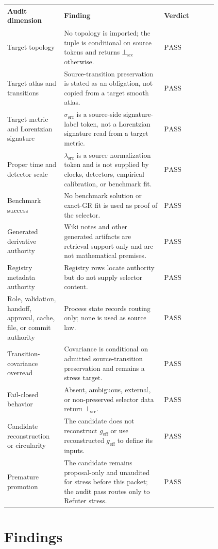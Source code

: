 \documentclass[11pt]{article}
\newcommand{\geff}{g_{\mathrm{eff}}}
\newcommand{\SigTok}{\sigma_{\mathrm{src}}}
\newcommand{\ScaleTok}{\lambda_{\mathrm{src}}}
\newcommand{\BottomSrc}{\bot_{\mathrm{src}}}
\newcommand{\Pass}{\mathrm{PASS}}
\begin{document}
\begin{longtable}{p{0.23\linewidth}p{0.41\linewidth}p{0.22\linewidth}}
\toprule
Audit dimension & Finding & Verdict \\
\midrule
Target topology & No topology is imported; the tuple is conditional on source
tokens and returns \(\BottomSrc\) otherwise. & \(\Pass\) \\
Target atlas and transitions & Source-transition preservation is stated as an
obligation, not copied from a target smooth atlas. & \(\Pass\) \\
Target metric and Lorentzian signature & \(\SigTok\) is a source-side
signature-label token, not a Lorentzian signature read from a target metric. &
\(\Pass\) \\
Proper time and detector scale & \(\ScaleTok\) is a source-normalization token
and is not supplied by clocks, detectors, empirical calibration, or benchmark
fit. & \(\Pass\) \\
Benchmark success & No benchmark solution or exact-GR fit is used as proof of
the selector. & \(\Pass\) \\
Generated derivative authority & Wiki notes and other generated artifacts are
retrieval support only and are not mathematical premises. & \(\Pass\) \\
Registry metadata authority & Registry rows locate authority but do not supply
selector content. & \(\Pass\) \\
Role, validation, handoff, approval, cache, file, or commit authority & Process
state records routing only; none is used as source law. & \(\Pass\) \\
Transition-covariance overread & Covariance is conditional on admitted
source-transition preservation and remains a stress target. & \(\Pass\) \\
Fail-closed behavior & Absent, ambiguous, external, or non-preserved selector
data return \(\BottomSrc\). & \(\Pass\) \\
Candidate reconstruction or circularity & The candidate does not reconstruct
\(\geff\) or use reconstructed \(\geff\) to define its inputs. & \(\Pass\) \\
Premature promotion & The candidate remains proposal-only and unaudited for
stress before this packet; the audit pass routes only to Refuter stress. &
\(\Pass\) \\
\bottomrule
\end{longtable}

\section{Findings}
\end{document}

